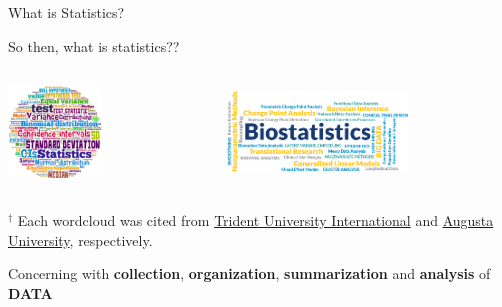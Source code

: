 \documentclass[9pt,ignorenonframetext,xcolor=dvipsnames]{beamer}
\begin{document}
\begin{frame}{What is Statistics?}

\large{So then, what is statistics??}

\vspace{0.5cm}

\begin{columns}
  \begin{column}{0.4\textwidth}
    \begin{center}
      \includegraphics[width = 2.5cm, height = 2.5cm]{StatisticsWords_Meg.jpg}
    \end{center}
  \end{column}
  \begin{column}{0.6\textwidth}
    \begin{center}
      \includegraphics[width = 4.8cm, height = 2.5cm]{wordcloud-biostatics.png}
    \end{center}
  \end{column}
\end{columns}

\tiny{$^{\dagger}$ Each wordcloud was cited from \href{http://blog.trident.edu/-temporary-slug-8756cc7e-1d1b-458e-94e2-3ff603f80c9e}{Trident University International} and \href{http://www.augusta.edu/mcg/dphs/biostats/research/index.php}{Augusta University}, respectively.}

\vspace{0.3cm} \normalsize

\begin{tcolorbox}[colback=gray!10,colframe=black, title=\textbf{Statistics}]
Concerning with \textbf{collection}, \textbf{organization}, \textbf{summarization} and \textbf{analysis} of \textbf{DATA}
\end{tcolorbox}

\end{frame}
\end{document}
